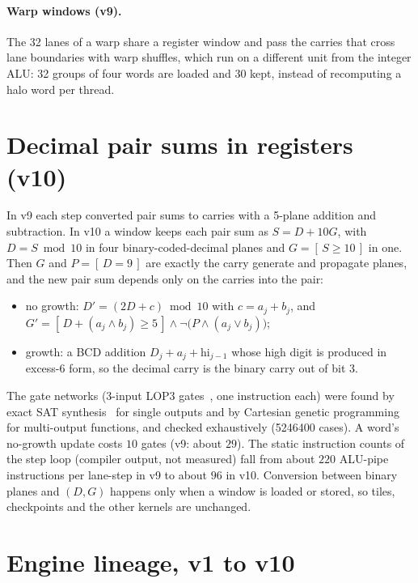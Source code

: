 \documentclass[11pt,a4paper]{article}
\newcommand{\Iverson}[1]{[\,#1\,]}
\theoremstyle{remark}
\begin{document}
\paragraph{Warp windows (v9).}
The 32 lanes of a warp share a register window and pass the carries that cross lane boundaries with warp shuffles, which run on a different unit from the integer ALU: 32 groups of four words are loaded and 30 kept, instead of recomputing a halo word per thread.

\section{Decimal pair sums in registers (v10)}\label{sec:decimal}

In v9 each step converted pair sums to carries with a 5-plane addition and subtraction. In v10 a window keeps each pair sum as $S=D+10G$, with $D=S\bmod 10$ in four binary-coded-decimal planes and $G=\Iverson{S\ge10}$ in one. Then $G$ and $P=\Iverson{D=9}$ are exactly the carry generate and propagate planes, and the new pair sum depends only on the carries into the pair:
\begin{itemize}
\item no growth: $D'=(2D+c)\bmod 10$ with $c=a_j+b_j$, and $G'=\Iverson{D+(a_j\land b_j)\ge5}\land\lnot\bigl(P\land(a_j\lor b_j)\bigr)$;
\item growth: a BCD addition $D_j+a_j+\mathrm{hi}_{j-1}$ whose high digit is produced in excess-6 form, so the decimal carry is the binary carry out of bit 3.
\end{itemize}
The gate networks (3-input LOP3 gates~\cite{ptx}, one instruction each) were found by exact SAT synthesis~\cite{kojevnikov2009} for single outputs and by Cartesian genetic programming~\cite{miller2000} for multi-output functions, and checked exhaustively (\num{5246400} cases). A word's no-growth update costs $10$ gates (v9: about $29$). The static instruction counts of the step loop (compiler output, not measured) fall from about $220$ ALU-pipe instructions per lane-step in v9 to about $96$ in v10. Conversion between binary planes and $(D,G)$ happens only when a window is loaded or stored, so tiles, checkpoints and the other kernels are unchanged.

\section{Engine lineage, v1 to v10}\label{sec:lineage}
\end{document}
